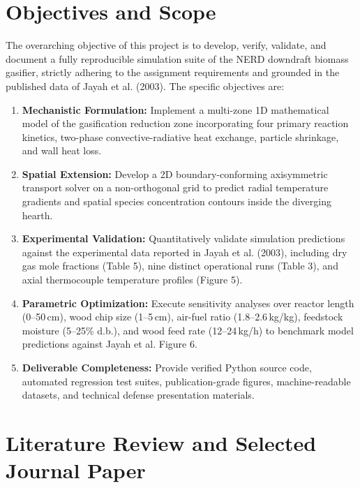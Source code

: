 \documentclass[11pt,a4paper]{article}
\begin{document}
\section{Objectives and Scope}
The overarching objective of this project is to develop, verify, validate, and document a fully reproducible simulation suite of the NERD downdraft biomass gasifier, strictly adhering to the assignment requirements and grounded in the published data of Jayah et al. (2003). The specific objectives are:
\begin{enumerate}[leftmargin=2.0em]
    \item \textbf{Mechanistic Formulation:} Implement a multi-zone 1D mathematical model of the gasification reduction zone incorporating four primary reaction kinetics, two-phase convective-radiative heat exchange, particle shrinkage, and wall heat loss.
    \item \textbf{Spatial Extension:} Develop a 2D boundary-conforming axisymmetric transport solver on a non-orthogonal grid to predict radial temperature gradients and spatial species concentration contours inside the diverging hearth.
    \item \textbf{Experimental Validation:} Quantitatively validate simulation predictions against the experimental data reported in Jayah et al. (2003), including dry gas mole fractions (Table 5), nine distinct operational runs (Table 3), and axial thermocouple temperature profiles (Figure 5).
    \item \textbf{Parametric Optimization:} Execute sensitivity analyses over reactor length (0--50\,cm), wood chip size (1--5\,cm), air-fuel ratio (1.8--2.6\,kg/kg), feedstock moisture (5--25\% d.b.), and wood feed rate (12--24\,kg/h) to benchmark model predictions against Jayah et al. Figure 6.
    \item \textbf{Deliverable Completeness:} Provide verified Python source code, automated regression test suites, publication-grade figures, machine-readable datasets, and technical defense presentation materials.
\end{enumerate}

\section{Literature Review and Selected Journal Paper}
\end{document}
